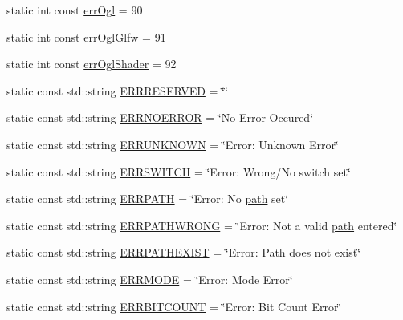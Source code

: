 \begin{DoxyCompactItemize}
\item 
static int const \mbox{\hyperlink{classErrorHandler_aabb7a10334f0e7042faf095dbb185669}{err\+Ogl}} = 90
\item 
static int const \mbox{\hyperlink{classErrorHandler_abba2d4095016a9ef04ce4d9c6f5de268}{err\+Ogl\+Glfw}} = 91
\item 
static int const \mbox{\hyperlink{classErrorHandler_ac5a1e3e43604463aff7b8822450920bc}{err\+Ogl\+Shader}} = 92
\item 
static const std\+::string \mbox{\hyperlink{classErrorHandler_a737a712190c5e9dcbd11230bd3c2eaca}{E\+R\+R\+R\+E\+S\+E\+R\+V\+ED}} = \char`\"{}\char`\"{}
\item 
static const std\+::string \mbox{\hyperlink{classErrorHandler_ae805d5476c00a9687c15183268d4e2dd}{E\+R\+R\+N\+O\+E\+R\+R\+OR}} = \char`\"{}No Error Occured\char`\"{}
\item 
static const std\+::string \mbox{\hyperlink{classErrorHandler_a9530db091517e099bc9bad620390c31d}{E\+R\+R\+U\+N\+K\+N\+O\+WN}} = \char`\"{}Error\+: Unknown Error\char`\"{}
\item 
static const std\+::string \mbox{\hyperlink{classErrorHandler_a7d2d47caa057173f4a55e92fd62e9fb8}{E\+R\+R\+S\+W\+I\+T\+CH}} = \char`\"{}Error\+: Wrong/No switch set\char`\"{}
\item 
static const std\+::string \mbox{\hyperlink{classErrorHandler_adef43ff4191a79c860f085a59b7d6f6a}{E\+R\+R\+P\+A\+TH}} = \char`\"{}Error\+: No \mbox{\hyperlink{classErrorHandler_aeabbc987b7eaa01b6d006b55b4e00574}{path}} set\char`\"{}
\item 
static const std\+::string \mbox{\hyperlink{classErrorHandler_aaab6de85cae710a56ae6324b06a42179}{E\+R\+R\+P\+A\+T\+H\+W\+R\+O\+NG}} = \char`\"{}Error\+: Not a valid \mbox{\hyperlink{classErrorHandler_aeabbc987b7eaa01b6d006b55b4e00574}{path}} entered\char`\"{}
\item 
static const std\+::string \mbox{\hyperlink{classErrorHandler_a18de05a2e4538d1417f22b02bbb763bf}{E\+R\+R\+P\+A\+T\+H\+E\+X\+I\+ST}} = \char`\"{}Error\+: Path does not exist\char`\"{}
\item 
static const std\+::string \mbox{\hyperlink{classErrorHandler_a88183b288608b1f8c54c84a27d5f6a40}{E\+R\+R\+M\+O\+DE}} = \char`\"{}Error\+: Mode Error\char`\"{}
\item 
static const std\+::string \mbox{\hyperlink{classErrorHandler_aaca2b9c33a1ad2bcc5d311cb4e5ca8f8}{E\+R\+R\+B\+I\+T\+C\+O\+U\+NT}} = \char`\"{}Error\+: Bit Count Error\char`\"{}
\item 

\end{DoxyCompactItemize}
